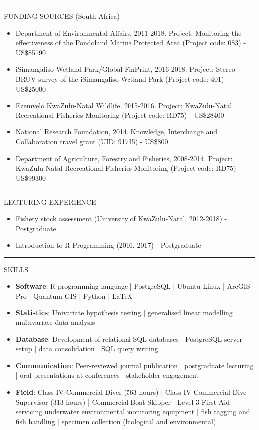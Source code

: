 \documentclass[10pt,a4paper]{article}
\begin{document}
\hrule
\vspace{6pt}
\noindent
FUNDING SOURCES (South Africa)
	\begin{itemize}
	\setlength\itemsep{0.05em}
	\item Department of Environmental Affairs, 2011-2018. Project: Monitoring the effectiveness of the Pondoland Marine Protected Area (Project code: 083) - US\$85190
	\item iSimangaliso Wetland Park/Global FinPrint, 2016-2018. Project: Stereo-BRUV survey of the iSimangaliso Wetland Park (Project code: 401) - US\$25000
	\item Ezemvelo KwaZulu-Natal Wildlife, 2015-2016. Project: KwaZulu-Natal Recreational Fisheries Monitoring (Project code: RD75) - US\$28400
	\item National Research Foundation, 2014. Knowledge, Interchange and Collaboration travel grant (UID: 91735) - US\$800
	\item Department of Agriculture, Forestry and Fisheries, 2008-2014. Project: KwaZulu-Natal Recreational Fisheries Monitoring (Project code: RD75) - US\$99300  
	\end{itemize}
\hrule	
\vspace{6pt}
\noindent
LECTURING EXPERIENCE
	\begin{itemize}
		\setlength\itemsep{0.05em}
		\item Fishery stock assessment (University of KwaZulu-Natal, 2012-2018) - Postgraduate
		\item Introduction to R Programming (2016, 2017) - Postgraduate
	\end{itemize}

\hrule
\vspace{6pt}
\noindent
SKILLS
	\begin{itemize}
		\setlength\itemsep{0.05em}
		\item \textbf{Software}: R programming language | PostgreSQL | Ubuntu Linux | 
		ArcGIS Pro | Quantum GIS | Python | \LaTeX\
		\item \textbf{Statistics}: Univariate hypothesis testing | generalised linear modelling | 
		multivariate data analysis
		\item \textbf{Database}: Development of relational SQL databases | PostgreSQL server setup | data consolidation | SQL query writing
		\item \textbf{Communication}: Peer-reviewed journal publication | postgraduate lecturing | oral 
		presentations at conferences | stakeholder engagement
		\item \textbf{Field}: Class IV Commercial Diver (563 hours) | Class IV Commercial Dive Supervisor 
		(313 hours) | Commercial Boat Skipper | Level 3 First Aid | servicing underwater environmental 
		monitoring equipment | fish tagging and fish handling | specimen collection (biological and					environmental)
	\end{itemize}	
\end{document}
